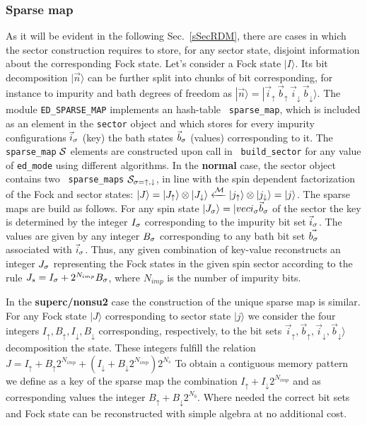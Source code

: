 \documentclass[final,3p,10pt]{elsarticle}
\newcommand{\secu}[1]
{Sec.~\ref{#1}}
\newcommand{\ket}[1]
{|#1\rangle}
\def\up{\uparrow} \def\down{\downarrow} \def\dw{\downarrow}
\begin{document}
\subsubsection{Sparse map}\label{CodeSparseMap}
As it will be evident in the following \secu{sSecRDM}, there are cases in
which the sector construction requires to store, for any sector state,
disjoint information about the corresponding Fock state.
Let's consider a Fock state $\ket{I}$. Its bit decomposition
$\ket{\vec{n}}$ can be further split into chunks of bit corresponding,
for instance to impurity and bath degrees of freedom as 
$\ket{\vec{n}}=\ket{\vec{i}_\up\,\vec{b}_\up\,\vec{i}_\dw\,\vec{b}_\dw}$.  
The module {\tt ED\_SPARSE\_MAP} implements an hash-table {\tt
  sparse\_map}, which is included as an element in the {\tt sector} object and  
which stores  for every impurity configurations $\vec{i}_\s$ (key) the
bath states $\vec{b}_\s$ (values) corresponding to it.
The {\tt sparse\_map} ${\cal S}$ elements are constructed upon call in {\tt
  build\_sector} for any value of {\tt ed\_mode} using different
algorithms.
In the {\bf normal} case, the sector object contains two {\tt
  sparse\_maps} ${\cal S}_{\s=\up,\dw}$, in line with the
spin dependent factorization of the Fock and sector states: 
$\ket{J}=\ket{J_\up}\otimes\ket{J_\dw} \xleftarrow{\MM}
\ket{j_\up}\otimes\ket{j_\dw}=\ket{j}$.
The sparse maps are build as follows. 
For any spin state $\ket{J_\s}=\ket{{vec{i}_{\s}\vec{b}_{\s}}$ of the sector
the key is determined by the integer $I_\s$ corresponding to the
impurity bit set $\vec{i}_\s$. The values are given by any 
integer $B_\s$ corresponding to any bath bit set
$\vec{b_\s}$ associated with $\vec{i}_\s$.
Thus, any given combination of key-value
reconstructs an integer $J_\s$ representing the Fock states in the
given spin sector according to the rule $J_s = I_\s +
2^{N_{imp}}B_\s$, where $N_{imp}$ is the number of impurity bits. 

In the {\bf superc/nonsu2} case the construction of the unique sparse
map is similar. For any Fock state $\ket{J}$ corresponding to sector
state $\ket{j}$ we consider the four integers $I_\up, B_\up, I_\dw,
B_\dw$ corresponding, respectively, to the bit sets
$\vec{i}_\up,\vec{b}_\up,\vec{i}_\dw,\vec{b}_\dw}$ decomposition the
state. These integers fulfill the relation
$
J =I_\up +  B_\up2^{N_{imp}} + (I_\dw +  B_\dw2^{N_{imp}})2^{N_s}
$
To obtain a contiguous memory pattern we define as a key of the sparse
map the combination $I_\up + I_\dw2^{N_{imp}}$ and as corresponding
  values the integer $B_\up + B_\dw2^{N_b}$. Where needed the correct
  bit sets and Fock state can be reconstructed with simple algebra at
  no additional cost.   
\end{document}
